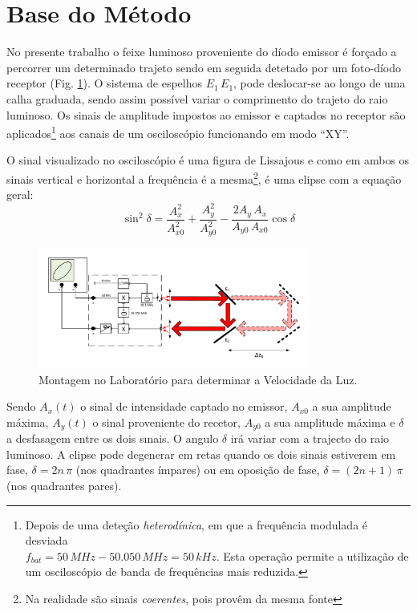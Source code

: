 \documentclass[a4paper,12pt]{article}      %
\begin{document}

\section{\sf Base do Método}
No presente trabalho o feixe luminoso proveniente do díodo emissor
é forçado a percorrer um determinado trajeto sendo em seguida detetado
por um foto-díodo receptor (Fig. \ref{fig:Montagem}). O sistema de espelhos $E_1\,E_1$, pode deslocar-se ao longo de uma calha graduada,
sendo assim possível variar o comprimento do trajeto do raio luminoso. Os
sinais de amplitude impostos ao emissor e captados no receptor são aplicados\footnote{Depois de uma deteção \emph{heterodínica}, em que a frequência modulada é desviada \\ 
$f_{bat}=50\, MHz -50.050\, MHz = 50\,kHz$. Esta operação permite a utilização de um osciloscópio de banda de frequências mais reduzida.} 
aos canais de um osciloscópio funcionando em modo “XY”.

O sinal visualizado no osciloscópio é uma figura de Lissajous e como em ambos os sinais vertical e horizontal a frequência é a 
mesma\footnote{Na realidade são sinais \emph{coerentes}, pois provêm da mesma fonte}, é uma elipse com a equação geral:
\begin{equation}
	\label{eq:elipse}
	\sin^2 \delta = \frac{A_x^2}{A_{x0}^2} + \frac{A_y^2}{A_{y0}^2} - \frac{2 A_y\,A_x}{A_{y0}\,A_{x0}} \cos  \delta
\end{equation}

\begin{figure}
	[htb]  \centering 
	\includegraphics[width=0.8\textwidth]{Vel_esquema}
	\caption{Montagem no Laboratório para determinar a Velocidade da Luz. \label{fig:Montagem}} 
\end{figure}

Sendo $A_x(t)$ o sinal de intensidade captado no emissor,  $A_{x0}$ a sua amplitude máxima,  $A_y(t)$ o sinal
proveniente do recetor, $A_{y0}$ a sua amplitude máxima e $\delta$ a desfasagem entre os dois
sınais. O angulo $\delta$ irá variar com a trajecto do raio luminoso.  A elipse pode degenerar em retas quando os dois sinais estiverem
em fase, $\delta = 2n\,\pi$ (nos quadrantes ímpares)  ou em oposição de fase, $\delta = (2n+1)\,\pi$ (nos quadrantes pares). 
\end{document}
